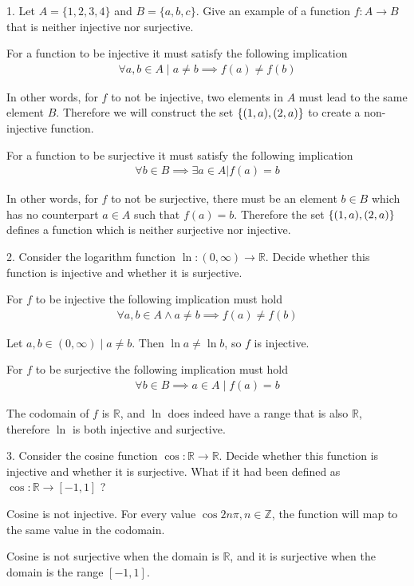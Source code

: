 \documentclass{idrisMemo}
\newcommand{\inj}{
\item For a function to be injective it must satisfy the following implication
\begin{align*}
    \forall a,b \in A\mid a\neq b\implies f(a)\neq f(b)
\end{align*}
}
\newcommand{\surj}{
\item For a function to be surjective it must satisfy the following implication
\begin{align*}
    \forall b \in B \implies \exists a \in A | f(a) = b
\end{align*}
}
\begin{document}
\toc
\thispagestyle{styleTOC}
\pagebreak
\pagestyle{styleE}

\begin{prooflist}{1. Let $A=\{1,2,3,4\}$ and $B=\{a, b, c\}$. Give an example of
    a function $f: A \rightarrow B$ that is neither injective nor surjective.}
\inj{}
\item In other words, for $f$ to not be injective, two elements in $A$ must lead
    to the same element $B$. Therefore we will construct the set $\{(1, a),
    (2, a)\}$ to create a non-injective function.
\surj{}
\item In other words, for $f$ to not be surjective, there must be an element
    $b\in B$ which has no counterpart $a \in A$ such that $f(a) = b$. Therefore the set
    $\{(1, a), (2, a)\}$ defines a function which is neither surjective nor
    injective.
\end{prooflist}

\begin{prooflist}{2. Consider the logarithm function $\ln :(0, \infty)
    \rightarrow \mathbb{R}$. Decide whether this function is injective and
    whether it is surjective.}
\item For $f$ to be injective the following implication must hold
\begin{align*}
    \forall a, b \in A \land a\neq b\implies f(a) \neq f(b)
\end{align*}
\item Let $a, b\in (0, \infty)\mid a\neq b$. Then $\ln a \neq \ln b$, so $f$ is
    injective.
\item For $f$ to be surjective the following implication must hold
\begin{align*}
    \forall b \in B \implies a \in A \mid f(a) = b
\end{align*}
\item The codomain of $f$ is $\mathbb{R}$, and $\ln$ does indeed have a range
    that is also $\mathbb{R}$, therefore $\ln$ is both injective and surjective.
\end{prooflist}

\begin{prooflist}{3. Consider the cosine function $\cos : \mathbb{R} \rightarrow
\mathbb{R}$. Decide whether this function is injective and whether it is
surjective. What if it had been defined as $\cos : \mathbb{R} \rightarrow[-1,1]$
?}
\item Cosine is not injective. For every value $\cos 2n\pi, n\in \mathbb{Z}$,
    the function will map to the same value in the codomain.
\item Cosine is not surjective when the domain is $\mathbb{R}$, and it is
    surjective when the domain is the range $[-1, 1]$.
\end{prooflist}
\end{document}
